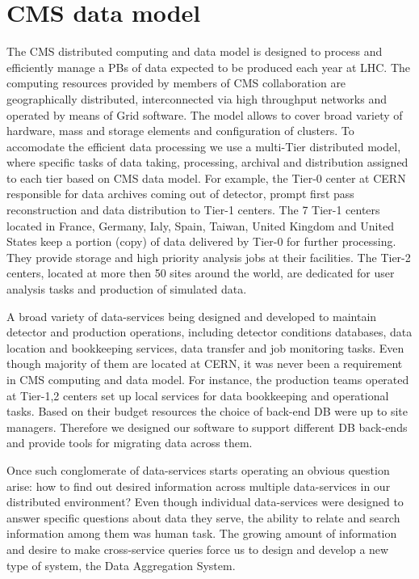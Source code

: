 \documentclass[a4paper]{jpconf}
\begin{document}
\section{CMS data model\label{DataModel}}
The CMS distributed computing and data model \cite{CMSDataModel} 
is designed to process
and efficiently manage a PBs of data expected to be produced each year
at LHC. The computing resources provided by members of CMS
collaboration are geographically distributed, 
interconnected via high throughput networks and operated by means 
of Grid software. The model allows to cover broad variety of
hardware, mass and storage elements and configuration of
clusters. To accomodate the efficient data processing we use 
a multi-Tier distributed model, where specific tasks of data taking,
processing, archival and distribution assigned to each tier based
on CMS data model. For example, the Tier-0 center at CERN responsible
for data archives coming out of detector, prompt first pass reconstruction
and data distribution to Tier-1 centers. The 7 Tier-1 centers
located in France, Germany, Ialy, Spain, Taiwan, United Kingdom and United States
keep a portion (copy) of data delivered by Tier-0 for further processing.
They provide storage and high priority analysis jobs at their facilities.
The Tier-2 centers, located at more then 50 sites around the world,
are dedicated for user analysis tasks and production of simulated data.

A broad variety of data-services being designed and developed to
maintain detector and production operations, including detector
conditions databases, data location and bookkeeping services,
data transfer and job monitoring tasks. Even though majority of them
are located at CERN, it was never been a requirement in CMS computing
and data model. For instance, the production teams operated at Tier-1,2
centers set up local services for data bookkeeping and operational
tasks. Based on their budget resources the choice of back-end DB were
up to site managers. Therefore we designed our software to support different
DB back-ends and provide tools for migrating data across them.

Once such conglomerate of data-services starts operating an obvious
question arise: how to find out desired information across multiple data-services
in our distributed environment? Even though individual data-services were designed
to answer specific questions about data they serve, the ability to relate and search
information among them was human task. The growing amount of information
and desire to make cross-service queries force us to design and develop a new
type of system, the Data Aggregation System.
\end{document}
